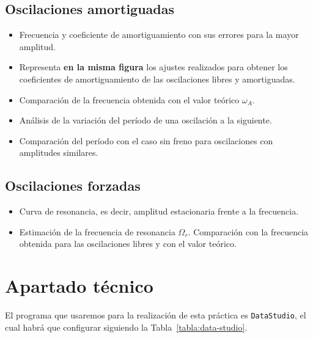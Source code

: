 \documentclass[11pt]{articulo}
\begin{document}
\subsection*{Oscilaciones amortiguadas}

\begin{itemize}

\item{Frecuencia y coeficiente de amortiguamiento con sus errores para la mayor amplitud.}
\item{Representa {\bf en la misma figura} los ajustes realizados para obtener los coeficientes de amortiguamiento de las oscilaciones libres y amortiguadas.}
\item{Comparaci\'on de la frecuencia obtenida con el valor te\'orico $\omega_A$.}
\item{An\'alisis de la variaci\'on del per\'iodo de una oscilaci\'on a la siguiente.}
\item{Comparaci\'on del per\'iodo con el caso sin freno para oscilaciones con amplitudes similares.}

\end{itemize}

\subsection*{Oscilaciones forzadas}

\begin{itemize}

\item{Curva de resonancia, es decir, amplitud estacionaria frente a la frecuencia.}
\item{Estimaci\'on de la frecuencia de resonancia $\Omega_r$. Comparaci\'on con la frecuencia obtenida para las oscilaciones libres y con el valor te\'orico.}

\end{itemize}


\section*{Apartado t\'ecnico}

El programa que usaremos para la realizaci\'on de esta pr\'actica es {\tt DataStudio}, el cual habr\'a que configurar siguiendo la Tabla~\ref{tabla:data-studio}.
\end{document}
